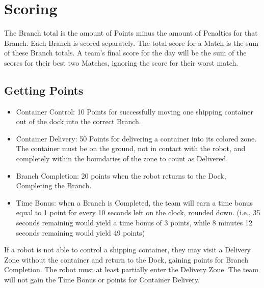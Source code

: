 \section{Scoring}

The Branch total is the amount of Points minus the amount of Penalties for that Branch. Each Branch is scored separately. The total score for a Match is the sum of these Branch totals. A team’s final score for the day will be the sum of the scores for their best two Matches, ignoring the score for their worst match. 

\subsection{Getting Points}
\begin{itemize}
    \item Container Control: 10 Points for successfully moving one shipping container out of the dock into the correct Branch. 
    \item Container Delivery: 50 Points for delivering a container into its colored zone. The container must be on the ground, not in contact with the robot, and completely within the boundaries of the zone to count as Delivered.
    \item Branch Completion: 20 points when the robot returns to the Dock, Completing the Branch.
    \item Time Bonus: when a Branch is Completed, the team will earn a time bonus equal to 1 point for every 10 seconds left on the clock, rounded down. (i.e., 35 seconds remaining would yield a time bonus of 3 points, while 8 minutes 12 seconds remaining would yield 49 points)
\end{itemize}

\noindent
If a robot is not able to control a shipping container, they may visit a Delivery Zone without the container and return to the Dock, gaining points for Branch Completion. The robot must at least partially enter the Delivery Zone. The team will not gain the Time Bonus or points for Container Delivery.


